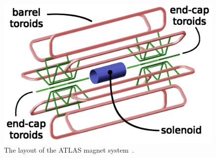 \vspace{1em}
\begin{figure}[!ht]
  \begin{center}
    \includegraphics[width=1\linewidth, angle=0]{figs/Detector/Magnet_schem.png}
  \end{center}
  \caption[The layout of the ATLAS magnet system.]{The layout of the ATLAS magnet system~\cite{det-magnet_fig}.}
  \label{fig:det-magnet_schem}
\end{figure}

